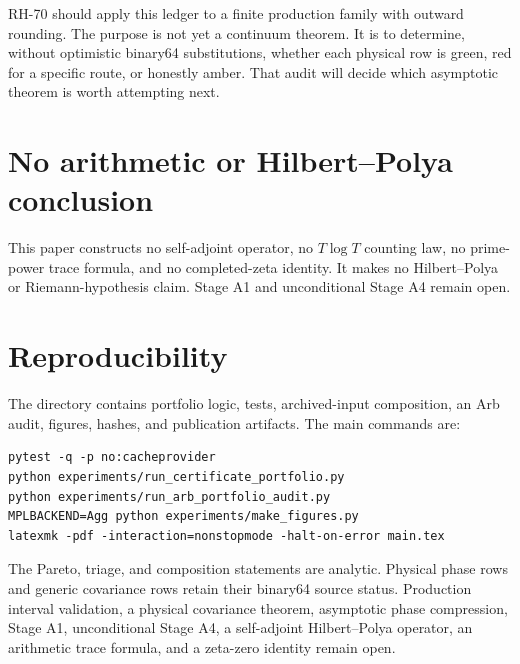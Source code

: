 \documentclass[11pt]{article}
\theoremstyle{definition}
\begin{document}
RH-70 should apply this ledger to a finite production family with outward
rounding.  The purpose is not yet a continuum theorem.  It is to determine,
without optimistic binary64 substitutions, whether each physical row is
green, red for a specific route, or honestly amber.  That audit will decide
which asymptotic theorem is worth attempting next.

\section{No arithmetic or Hilbert--Polya conclusion}

This paper constructs no self-adjoint operator, no $T\log T$ counting law,
no prime-power trace formula, and no completed-zeta identity.  It makes no
Hilbert--Polya or Riemann-hypothesis claim.  Stage A1 and unconditional Stage
A4 remain open.

\section{Reproducibility}

The directory contains portfolio logic, tests, archived-input composition,
an Arb audit, figures, hashes, and publication artifacts.  The main commands
are:
\begin{verbatim}
pytest -q -p no:cacheprovider
python experiments/run_certificate_portfolio.py
python experiments/run_arb_portfolio_audit.py
MPLBACKEND=Agg python experiments/make_figures.py
latexmk -pdf -interaction=nonstopmode -halt-on-error main.tex
\end{verbatim}

The Pareto, triage, and composition statements are analytic.  Physical
phase rows and generic covariance rows retain their binary64 source status.
Production interval validation, a physical covariance theorem, asymptotic
phase compression, Stage A1, unconditional Stage A4, a self-adjoint
Hilbert--Polya operator, an arithmetic trace formula, and a zeta-zero identity
remain open.



\end{document}
